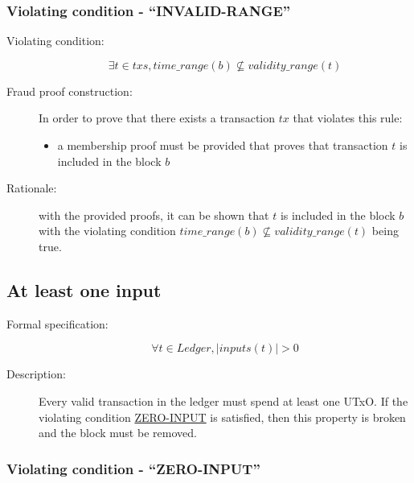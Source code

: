 \documentclass[../main.tex]{subfiles}
\begin{document}
\subsubsection{Violating condition - ``INVALID-RANGE''}
\label{sec:INVALID-RANGE}

\begin{description}

\item[Violating condition:]
\begin{equation*}
    \exists t \in txs, time\_range(b) \nsubseteq validity\_range(t)
\end{equation*}

\item[Fraud proof construction:] In order to prove that there exists a transaction $tx$ that violates this rule:
\begin{itemize}
    \item a membership proof must be provided that proves that transaction $t$ is included in the block $b$
\end{itemize}

\item[Rationale:] with the provided proofs, it can be shown that $t$ is included in the block $b$ with the violating condition $time\_range(b) \nsubseteq validity\_range(t)$ being true.

\end{description}

\subsection{At least one input}

\begin{description}

\item[Formal specification:]
\begin{equation*}
    \forall t \in Ledger, |inputs(t)| > 0
\end{equation*}

\item[Description:] Every valid transaction in the ledger must spend at least one UTxO.
  If the violating condition \hyperref[sec:ZERO-INPUT]{ZERO-INPUT} is satisfied, then this property is broken and the block must be removed.

\end{description}

\subsubsection{Violating condition - ``ZERO-INPUT''}
\label{sec:ZERO-INPUT}
\end{document}
